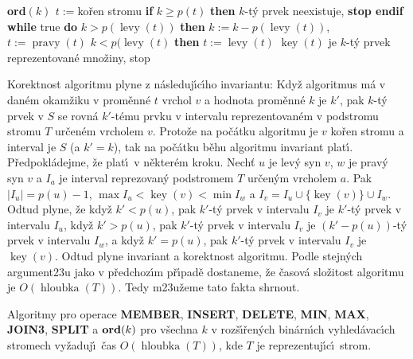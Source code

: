\documentclass[a4paper,12pt]{article}
\DeclareMathOperator*{\levy}{levy}
\DeclareMathOperator*{\pravy}{pravy}
\DeclareMathOperator*{\key}{key}
\DeclareMathOperator*{\hloubka}{hloubka}
\begin{document}
{\bf ord$(k)$ \newline 
$t:=$}ko\v ren stromu \newline 
{\bf if} $k\ge p(t)$ {\bf then} $k$-t\'y prvek neexistuje, {\bf stop endif\newline 
while} true {\bf do}\newline 
\phantom{---}{\bf if} $k>p(\levy(t))$ {\bf then}\newline 
\phantom{------}$k:=k-p(\levy(t))$, $t:=\pravy(t)$\newline 
\phantom{---}{\bf else}\newline 
\phantom{------}{\bf if} $k<p(\levy(t)$ {\bf then}\newline 
\phantom{---------}$t:=\levy(t)$\newline 
\phantom{------}{\bf else}\newline 
\phantom{---------}$\key(t)$ je $k$-t\'y prvek reprezentovan\'e mno\v ziny, stop \newline 
\phantom{------}{\bf endif}\newline 
\phantom{---}{\bf endif\newline 
enddo}
\bigskip

\flushpar Korektnost algoritmu plyne z n\'asleduj\'\i c\'\i ho invariantu:  
Kdy\v z algoritmus m\'a v dan\'em okam\v ziku v prom\v enn\'e $t$ vrchol $
v$ 
a hodnota prom\v enn\'e $k$ je $k'$, pak $k$-t\'y prvek v $S$ se rovn\'a 
$k'$-t\'emu prvku v intervalu reprezentovan\'em v podstromu 
stromu $T$ ur\v cen\'em vrcholem $v$.  Proto\v ze na po\v c\'atku algoritmu 
je $v$ ko\v ren stromu a interval je $S$ (a $k'=k$), tak na po\v c\'atku 
b\v ehu algoritmu invariant plat\'\i.  P\v redpokl\'adejme, \v ze plat\'\i\ v 
n\v ekter\'em kroku.  Nech\v t $u$ je lev\'y syn $v$, $w$ je prav\'y syn $
v$ a 
$I_a$ je interval reprezovan\'y podstromem $T$ ur\v cen\'ym vrcholem $
a$.  
Pak $|I_u|=p(u)-1$, $\max I_u<\key(v)<\min I_w$ a 
$I_v=I_u\cup \{\key(v)\}\cup I_w$.  Odtud plyne, \v ze kdy\v z $k'
<p(u)$, pak 
$k'$-t\'y prvek v intervalu $I_v$ je $k'$-t\'y prvek v intervalu $
I_u$, kdy\v z 
$k'>p(u)$, pak $k'$-t\'y prvek v intervalu $I_v$ je $(k'-p(u))$-t\'y prvek 
v intervalu $I_w$, a kdy\v z $k'=p(u)$, pak $k'$-t\'y prvek v intervalu $
I_v$ 
je $\key(v)$.  Odtud plyne invariant a korektnost algoritmu.  
Podle stejn\'ych argument\accent23u jako v p\v redchoz\'\i m p\v r\'\i pad\v e 
dostaneme, \v ze \v casov\'a slo\v zitost algoritmu je $O(\hloubka
(T))$.  
Tedy m\accent23u\v zeme tato fakta shrnout.  

Algoritmy pro operace {\bf MEMBER}, {\bf INSERT}, {\bf DE\-LE\-TE}, {\bf MIN}, {\bf MAX}, 
{\bf JOIN3}, {\bf SPLIT} a $\bold o\bold r\bold d(k)$ pro v\v sechna $
k$ v roz\v s\'\i\v ren\'ych bin\'ar\-n\'\i ch 
vy\-hled\'avac\'\i ch stromech vy\v zaduj\'\i\ \v cas $O(\hloubka
(T))$, kde $T$ je 
reprezentuj\'\i c\'\i\ strom. 
\endproclaim
\end{document}
